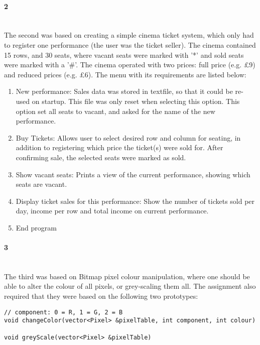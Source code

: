 \paragraph{ 2} ~\\
The second was based on creating a simple cinema ticket system, which only had to register one performance (the user was the ticket seller).
The cinema contained 15 rows, and 30 seats, where vacant seats were marked with '*' and sold seats were marked with a '\#'.
The cinema operated with two prices: full price (e.g. £9) and reduced prices (e.g. £6).
The menu with its requirements are listed below: 
\begin{enumerate}
	\item New performance: 
	Sales data was stored in textfile, so that it could be re-used on startup. 
	This file was only reset when selecting this option. 
	This option set all seats to vacant, and asked for the name of the new performance.
	\item Buy Tickets: 
	Allows user to select desired row and column for seating, in addition to registering which price the ticket(s) were sold for.
	After confirming sale, the selected seats were marked as sold.
	\item Show vacant seats:
	Prints a view of the current performance, showing which seats are  vacant.
	\item Display ticket sales for this performance:	
	Show the number of tickets sold per day, income per row and total income on current performance.
	\item End program
\end{enumerate}

\paragraph{ 3} ~\\
The third was based on Bitmap pixel colour manipulation, where one should be able to alter the colour of all pixels, or grey-scaling them all.
The assignment also required that they were based on the following two prototypes:
\begin{lstlisting}
// component: 0 = R, 1 = G, 2 = B
void changeColor(vector<Pixel> &pixelTable, int component, int colour) 

void greyScale(vector<Pixel> &pixelTable)
\end{lstlisting}

